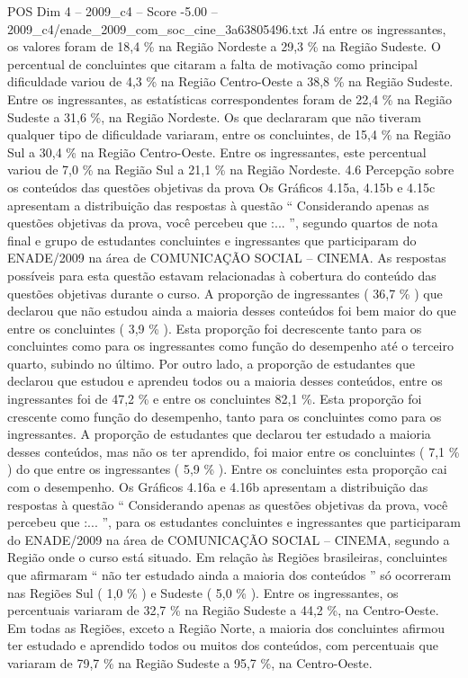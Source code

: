 \begin{textsample}{POS Dim 4 – 2009\_c4 – Score -5.00 – 2009\_c4/enade\_2009\_com\_soc\_cine\_3a63805496.txt}
Já entre os ingressantes, os valores foram de 18,4 \% na Região Nordeste a 29,3 \% na Região Sudeste.
O percentual de concluintes que citaram a falta de motivação como principal dificuldade variou de 4,3 \% na Região Centro-Oeste a 38,8 \% na Região Sudeste.
Entre os ingressantes, as estatísticas correspondentes foram de 22,4 \% na Região Sudeste a 31,6 \%, na Região Nordeste.
Os que declararam que não tiveram qualquer tipo de dificuldade variaram, entre os concluintes, de 15,4 \% na Região Sul a 30,4 \% na Região Centro-Oeste.
Entre os ingressantes, este percentual variou de 7,0 \% na Região Sul a 21,1 \% na Região Nordeste. 4.6 Percepção sobre os conteúdos das questões objetivas da prova Os Gráficos 4.15a, 4.15b e 4.15c apresentam a distribuição das respostas à questão “ Considerando apenas as questões objetivas da prova, você percebeu que :... ”, segundo quartos de nota final e grupo de estudantes concluintes e ingressantes que participaram do ENADE/2009 na área de COMUNICAÇÃO SOCIAL – CINEMA.
As respostas possíveis para esta questão estavam relacionadas à cobertura do conteúdo das questões objetivas durante o curso.
A proporção de ingressantes ( 36,7 \% ) que declarou que não estudou ainda a maioria desses conteúdos foi bem maior do que entre os concluintes ( 3,9 \% ).
Esta proporção foi decrescente tanto para os concluintes como para os ingressantes como função do desempenho até o terceiro quarto, subindo no último.
Por outro lado, a proporção de estudantes que declarou que estudou e aprendeu todos ou a maioria desses conteúdos, entre os ingressantes foi de 47,2 \% e entre os concluintes 82,1 \%.
Esta proporção foi crescente como função do desempenho, tanto para os concluintes como para os ingressantes.
A proporção de estudantes que declarou ter estudado a maioria desses conteúdos, mas não os ter aprendido, foi maior entre os concluintes ( 7,1 \% ) do que entre os ingressantes ( 5,9 \% ).
Entre os concluintes esta proporção cai com o desempenho.
Os Gráficos 4.16a e 4.16b apresentam a distribuição das respostas à questão “ Considerando apenas as questões objetivas da prova, você percebeu que :... ”, para os estudantes concluintes e ingressantes que participaram do ENADE/2009 na área de COMUNICAÇÃO SOCIAL – CINEMA, segundo a Região onde o curso está situado.
Em relação às Regiões brasileiras, concluintes que afirmaram “ não ter estudado ainda a maioria dos conteúdos ” só ocorreram nas Regiões Sul ( 1,0 \% ) e Sudeste ( 5,0 \% ).
Entre os ingressantes, os percentuais variaram de 32,7 \% na Região Sudeste a 44,2 \%, na Centro-Oeste.
Em todas as Regiões, exceto a Região Norte, a maioria dos concluintes afirmou ter estudado e aprendido todos ou muitos dos conteúdos, com percentuais que variaram de 79,7 \% na Região Sudeste a 95,7 \%, na Centro-Oeste.

\end{textsample}
